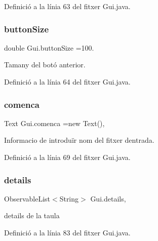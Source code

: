 Definició a la línia 63 del fitxer Gui.\+java.

\mbox{\label{class_gui_af49145c30968bfd148efa7e77df8082e}} 
\subsubsection{\texorpdfstring{button\+Size}{buttonSize}}
{\footnotesize\ttfamily double Gui.\+button\+Size =100.\hspace{0.3cm}{\ttfamily [private]}}



Tamany del botó anterior. 



Definició a la línia 64 del fitxer Gui.\+java.

\mbox{\label{class_gui_ac9724d96aa5ea5830fefb2a29e6193d5}} 
\subsubsection{\texorpdfstring{comenca}{comenca}}
{\footnotesize\ttfamily Text Gui.\+comenca =new Text()\hspace{0.3cm}{\ttfamily [static]}, {\ttfamily [private]}}



Informacio de introduïr nom del fitxer d\textquotesingle{}entrada. 



Definició a la línia 69 del fitxer Gui.\+java.

\mbox{\label{class_gui_a76ab837fe79bf857f48dfe94448b67e5}} 
\subsubsection{\texorpdfstring{details}{details}}
{\footnotesize\ttfamily Observable\+List$<$String$>$ Gui.\+details\hspace{0.3cm}{\ttfamily [static]}, {\ttfamily [private]}}



details de la taula 



Definició a la línia 83 del fitxer Gui.\+java.

